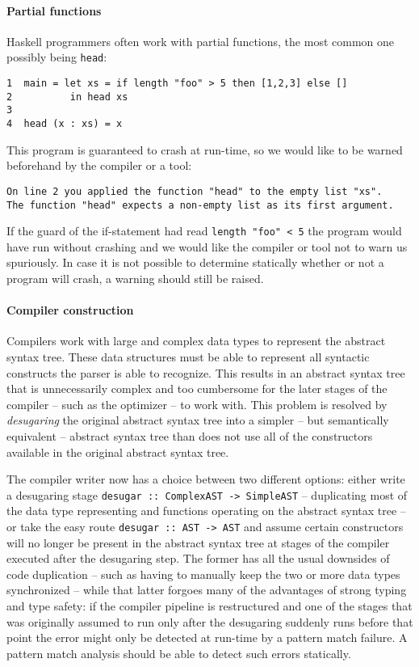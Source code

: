 \documentclass[a4paper]{report}
\begin{document}
\paragraph{Partial functions} Haskell programmers often work with partial functions, the most common one possibly being {\tt head}:

\begin{verbatim}
1  main = let xs = if length "foo" > 5 then [1,2,3] else []
2          in head xs
3
4  head (x : xs) = x
\end{verbatim}

This program is guaranteed to crash at run-time, so we would like to be warned beforehand by the compiler or a tool:

\begin{verbatim}
On line 2 you applied the function "head" to the empty list "xs".
The function "head" expects a non-empty list as its first argument.
\end{verbatim}

If the guard of the if-statement had read {\tt length "foo" < 5} the program would have run without crashing and we would like the compiler or tool not to warn us spuriously. In case it is not possible to determine statically whether or not a program will crash, a warning should still be raised.

\paragraph{Compiler construction}
Compilers work with large and complex data types to represent the abstract syntax tree. These data structures must be able to represent all syntactic constructs the parser is able to recognize. This results in an abstract syntax tree that is unnecessarily complex and too cumbersome for the later stages of the compiler -- such as the optimizer -- to work with. This problem is resolved by \emph{desugaring} the original abstract syntax tree into a simpler -- but semantically equivalent --  abstract syntax tree than does not use all of the constructors available in the original abstract syntax tree.

The compiler writer now has a choice between two different options: either write a desugaring stage {\tt desugar :: ComplexAST -> SimpleAST} -- duplicating most of the data type representing and functions operating on the abstract syntax tree -- or take the easy route {\tt desugar :: AST -> AST} and assume certain constructors will no longer be present in the abstract syntax tree at stages of the compiler executed after the desugaring step. The former has all the usual downsides of code duplication -- such as having to manually keep the two or more data types synchronized -- while that latter forgoes many of the advantages of strong typing and type safety: if the compiler pipeline is restructured and one of the stages that was originally assumed to run only after the desugaring suddenly runs before that point the error might only be detected at run-time by a pattern match failure. A pattern match analysis should be able to detect such errors statically.
\end{document}
